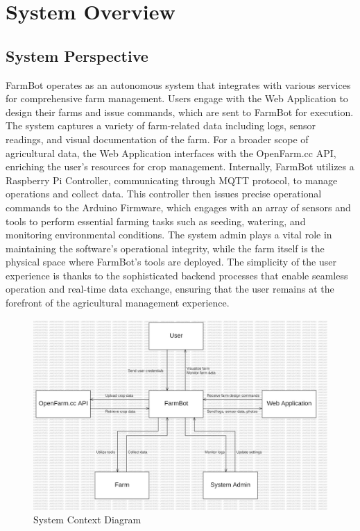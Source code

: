 \section{System Overview}
\subsection{System Perspective}
FarmBot operates as an autonomous system that integrates with various services for comprehensive farm management. Users engage with the Web Application to design their farms and issue commands, which are sent to FarmBot for execution. The system captures a variety of farm-related data including logs, sensor readings, and visual documentation of the farm. For a broader scope of agricultural data, the Web Application interfaces with the OpenFarm.cc API, enriching the user's resources for crop management. Internally, FarmBot utilizes a Raspberry Pi Controller, communicating through MQTT protocol, to manage operations and collect data. This controller then issues precise operational commands to the Arduino Firmware, which engages with an array of sensors and tools to perform essential farming tasks such as seeding, watering, and monitoring environmental conditions. The system admin plays a vital role in maintaining the software's operational integrity, while the farm itself is the physical space where FarmBot's tools are deployed. The simplicity of the user experience is thanks to the sophisticated backend processes that enable seamless operation and real-time data exchange, ensuring that the user remains at the forefront of the agricultural management experience.

\newpage

\begin{figure}[htbp]
    \centering
    \includegraphics[width=1\linewidth]{Figures/context_diagram.jpg}
    \caption{System Context Diagram}
    \label{System Context Diagram}
\end{figure}


